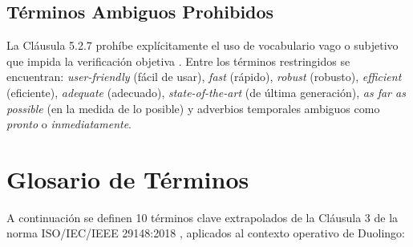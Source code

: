 \documentclass[11pt, a4paper]{article}
\begin{document}
\subsection{Términos Ambiguos Prohibidos}
La Cláusula 5.2.7 prohíbe explícitamente el uso de vocabulario vago o subjetivo que impida la verificación objetiva \cite{iso29148}. Entre los términos restringidos se encuentran: \textit{user-friendly} (fácil de usar), \textit{fast} (rápido), \textit{robust} (robusto), \textit{efficient} (eficiente), \textit{adequate} (adecuado), \textit{state-of-the-art} (de última generación), \textit{as far as possible} (en la medida de lo posible) y adverbios temporales ambiguos como \textit{pronto} o \textit{inmediatamente}.

\section{Glosario de Términos}
A continuación se definen 10 términos clave extrapolados de la Cláusula 3 de la norma ISO/IEC/IEEE 29148:2018 \cite{iso29148}, aplicados al contexto operativo de Duolingo:
\end{document}
